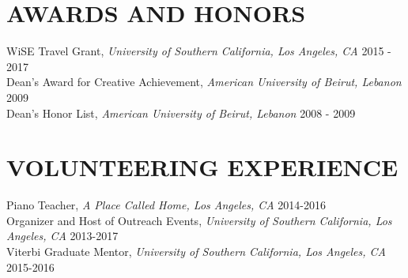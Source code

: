\documentclass[11pt]{res-modified}
\begin{document}
\begin{resume}
\section{AWARDS AND HONORS}
\vspace{1mm}
{WiSE Travel Grant}, \textit{University of Southern California, Los Angeles, CA} \hfill 2015 - 2017 \\
{Dean's Award for Creative Achievement}, \textit{American University of Beirut, Lebanon} \hfill 2009 \\
{Dean's Honor List}, \textit{American University of Beirut, Lebanon} \hfill 2008 - 2009

\section{VOLUNTEERING EXPERIENCE}
\vspace{1mm}
{Piano Teacher}, \textit{A Place Called Home, Los Angeles, CA} \hfill 2014-2016\\
{Organizer and Host of Outreach Events}, \textit{University of Southern California, Los Angeles, CA} \hfill 2013-2017\\
{Viterbi Graduate Mentor}, \textit{University of Southern California, Los Angeles, CA} \hfill 2015-2016\\


\end{resume}
\end{document}
